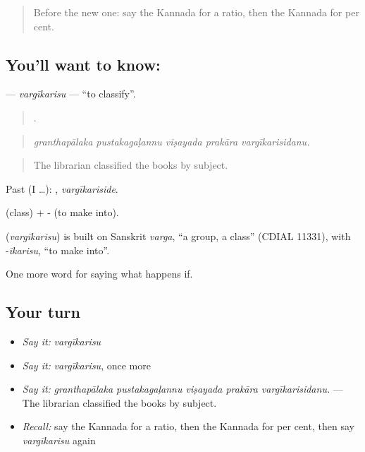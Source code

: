 \label{lesson:KA-C427-vargikarisu}



\begin{quote}
Before the new one: say the Kannada for a ratio, then the Kannada for per cent.
\end{quote}

\subsection*{You'll want to know: }
\textbf{} — \emph{vargīkarisu} — \textquotedblleft{}to classify\textquotedblright{}.

\begin{quote}
    .
\end{quote}

\begin{quote}
\emph{granthapālaka pustakagaḷannu viṣayada prakāra vargīkarisidanu.}
\end{quote}

\begin{quote}
The librarian classified the books by subject.
\end{quote}

Past (I …): , \emph{vargīkariside}.

 (class) + - (to make into).

\begin{cousinweb}
\textbf{} (\emph{vargīkarisu}) is built on Sanskrit \emph{varga}, \textquotedblleft{}a group, a class\textquotedblright{} (CDIAL 11331), with -\emph{īkarisu}, \textquotedblleft{}to make into\textquotedblright{}.
\end{cousinweb}

\begin{grammarlens}[title={What you've built}]
One more word for saying what happens if.
\end{grammarlens}

\subsection*{Your turn}
\begin{itemize}
\raggedright
  \item \emph{Say it:} \emph{vargīkarisu}
  \item \emph{Say it:} \emph{vargīkarisu}, once more
  \item \emph{Say it:} \emph{granthapālaka pustakagaḷannu viṣayada prakāra vargīkarisidanu.} — The librarian classified the books by subject.
  \item \emph{Recall:} say the Kannada for a ratio, then the Kannada for per cent, then say \emph{vargīkarisu} again
\end{itemize}

